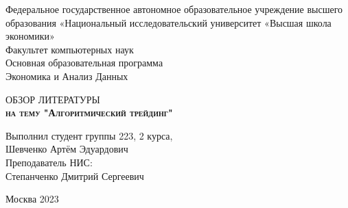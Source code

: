 \documentclass[a4paper,14pt]{extarticle}
\begin{document}
\begin{titlepage}
\newpage

{
\begin{center}
Федеральное государственное автономное образовательное учреждение высшего образования «Национальный исследовательский университет «Высшая школа экономики»
\\
\bigskip
Факультет компьютерных наук \\
Основная образовательная программа \\
Экономика и Анализ Данных \\
\end{center}
}

\vspace{8em}

\begin{center}
{\Large ОБЗОР ЛИТЕРАТУРЫ}\\
\textsc{\textbf{
на тему
\linebreak
"Алгоритмический трейдинг"}}
\end{center}

\vspace{2em}

{
\hfill\parbox{16cm}{
\hspace*{5cm}\hspace*{-5cm}Выполнил студент группы 223, 2 курса,\\
Шевченко Артём Эдуардович\\
 
\hspace*{5cm}\hspace*{-5cm}Преподаватель НИС:\\
Степанченко Дмитрий Сергеевич\\

}}

\vspace{\fill}

\begin{center}
Москва 2023
\end{center}

\end{titlepage}

\setcounter{page}{2}

{
	\hypersetup{linkcolor=black}
	\tableofcontents
}
\newpage
\end{document}

